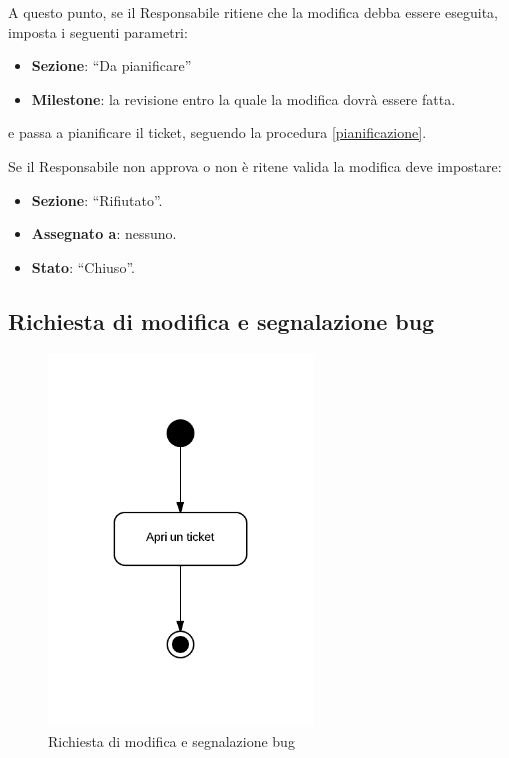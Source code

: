 A questo punto, se il Responsabile ritiene che la modifica debba essere eseguita, imposta i seguenti parametri:
\begin{itemize}
 \item \textbf{Sezione}: ``Da pianificare''
 \item \textbf{Milestone}: la revisione entro la quale la modifica dovrà essere fatta.
\end{itemize}
e passa a pianificare il ticket, seguendo la procedura \ref{pianificazione}.

Se il Responsabile non approva o non è ritene valida la modifica deve impostare:
\begin{itemize}
 \item \textbf{Sezione}: ``Rifiutato''.
 \item \textbf{Assegnato a}: nessuno.
 \item \textbf{Stato}: ``Chiuso''.
\end{itemize}

\subsection{Richiesta di modifica e segnalazione bug}

\begin{figure}[H]
    \centering
    \includegraphics[width=7cm]{uml-processi/Richiesta_di_modifica_e_segnalazione_bug.png}
    \caption{Richiesta di modifica e segnalazione bug}
\end{figure}

